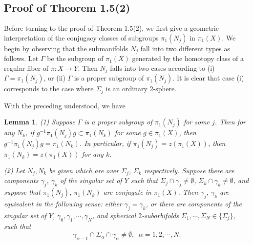 \documentclass[11pt]{amsart}
\theoremstyle{plain}
\numberwithin{theorem}{section}
\newtheorem{lemma}[theorem]{Lemma}
\theoremstyle{definition}
\begin{document}
\subsection{Proof of Theorem 1.5(2)}
Before turning to the proof of Theorem 1.5(2), we first give a geometric interpretation 
of the conjugacy classes of subgroups $\pi_1(N_j)$ in $\pi_1(X)$. We begin by observing that the submanifolds $N_j$ fall into two different types as follows. Let $\Gamma$ be the subgroup of $\pi_1(X)$ generated by the homotopy class of a regular fiber of $\pi: X\rightarrow Y$. Then $N_j$ falls into two cases 
according to (i) $\Gamma=\pi_1(N_j)$, or (ii) $\Gamma$ is a proper subgroup of $\pi_1(N_j)$.
It is clear that case (i) corresponds to the case where $\Sigma_j$ is an ordinary $2$-sphere. 

With the preceding understood, we have

\begin{lemma}
(1) Suppose $\Gamma$ is a proper subgroup of $\pi_1(N_j)$ for some $j$. Then for any $N_k$, if $g^{-1}\pi_1(N_j)g\subset \pi_1(N_k)$ for some $g\in \pi_1(X)$, then $g^{-1}\pi_1(N_j)g=\pi_1(N_k)$.
In particular, if $\pi_1(N_j)=z(\pi_1(X))$, then $\pi_1(N_k)=z(\pi_1(X))$ for any $k$.

(2) Let $N_j,N_k$ be given which are over $\Sigma_j$, $\Sigma_k$ respectively. Suppose
there are components $\gamma_j$, $\gamma_k$ of the singular set of $Y$ such that
$\Sigma_j\cap \gamma_j\neq \emptyset$, $\Sigma_k\cap \gamma_k\neq \emptyset$, and
suppose that $\pi_1(N_j)$, $\pi_1(N_k)$ are conjugate in $\pi_1(X)$. Then $\gamma_j$,
$\gamma_k$ are equivalent in the following sense: either $\gamma_j=\gamma_k$, or
there are components of the singular set of $Y$, $\gamma_0, \gamma_1, \cdots, \gamma_N$, 
and spherical $2$-suborbifolds $\Sigma_1,\cdots,\Sigma_N\in \{\Sigma_j\}$, such that
$$
\gamma_{\alpha-1} \cap \Sigma_\alpha\cap \gamma_\alpha\neq \emptyset, \;\;
\alpha=1,2,\cdots, N.
$$
\end{lemma}
\end{document}
